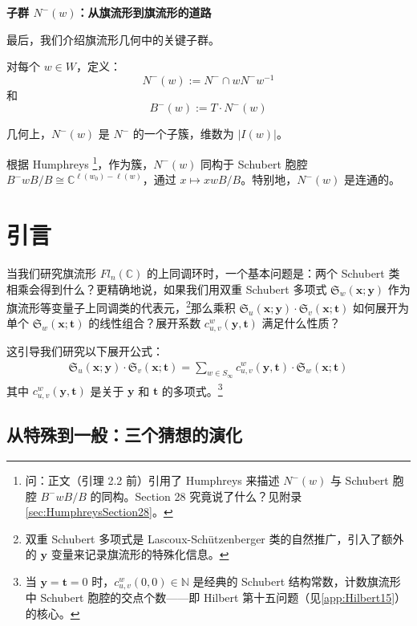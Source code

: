 \bigskip
\noindent\textbf{子群 $N^-(w)$：从旗流形到旗流形的道路}

最后，我们介绍旗流形几何中的关键子群。

\begin{Definition}[子群 $N^-(w)$ 与 $B^-(w)$]
\label{def:NMinusW}
对每个 $w \in W$，定义：
$$N^-(w) := N^- \cap w N^- w^{-1}$$
和
$$B^-(w) := T \cdot N^-(w)$$

几何上，$N^-(w)$ 是 $N^-$ 的一个子簇，维数为 $|I(w)|$。
\end{Definition}

根据 Humphreys \cite[Section 28]{humphreys1975}\footnote{问：正文（引理 2.2 前）引用了 Humphreys \cite[Section 28]{humphreys1975} 来描述 $N^-(w)$ 与 Schubert 胞腔 $B^-wB/B$ 的同构。Section 28 究竟说了什么？见附录 \cref{sec:HumphreysSection28}。}，作为簇，$N^-(w)$ 同构于 Schubert 胞腔 $B^-wB/B \cong \mathbb{C}^{\ell(w_0) - \ell(w)}$，通过 $x \mapsto xwB/B$。特别地，$N^-(w)$ 是连通的。

\section{引言}
\label{sec:Introduction}
\label{sec:Intro}

当我们研究旗流形 $Fl_n(\mathbb{C})$ 的上同调环时，一个基本问题是：两个 Schubert 类相乘会得到什么？更精确地说，如果我们用双重 Schubert 多项式 $\mathfrak{S}_w(\mathbf{x}; \mathbf{y})$ 作为旗流形等变量子上同调类的代表元，\footnote{双重 Schubert 多项式是 Lascoux-Schützenberger 类的自然推广，引入了额外的 $\mathbf{y}$ 变量来记录旗流形的特殊化信息。}那么乘积 $\mathfrak{S}_u(\mathbf{x}; \mathbf{y}) \cdot \mathfrak{S}_v(\mathbf{x}; \mathbf{t})$ 如何展开为单个 $\mathfrak{S}_w(\mathbf{x}; \mathbf{t})$ 的线性组合？展开系数 $c^w_{u,v}(\mathbf{y}, \mathbf{t})$ 满足什么性质？

这引导我们研究以下展开公式：
\begin{align*}
\mathfrak{S}_u(\mathbf{x}; \mathbf{y}) \cdot \mathfrak{S}_v(\mathbf{x}; \mathbf{t})
= \sum_{w \in S_\infty} c^w_{u,v}(\mathbf{y}, \mathbf{t}) \cdot \mathfrak{S}_w(\mathbf{x}; \mathbf{t})
\end{align*}
其中 $c^w_{u,v}(\mathbf{y}, \mathbf{t})$ 是关于 $\mathbf{y}$ 和 $\mathbf{t}$ 的多项式。\footnote{当 $\mathbf{y} = \mathbf{t} = 0$ 时，$c^w_{u,v}(0, 0) \in \mathbb{N}$ 是经典的 Schubert 结构常数，计数旗流形中 Schubert 胞腔的交点个数——即 Hilbert 第十五问题（见\cref{app:Hilbert15}）的核心。}

\subsection{从特殊到一般：三个猜想的演化}

